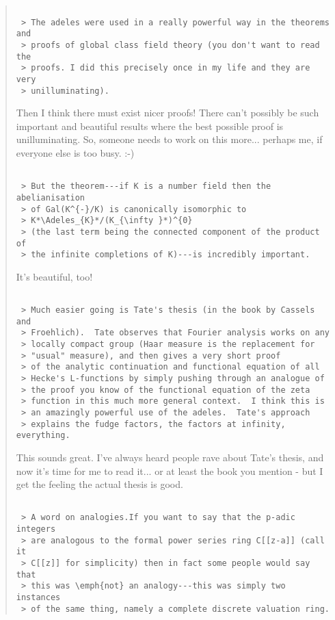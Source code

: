 \begin{quote}


\begin{verbatim}

 > The adeles were used in a really powerful way in the theorems and 
 > proofs of global class field theory (you don't want to read the 
 > proofs. I did this precisely once in my life and they are very 
 > unilluminating).
\end{verbatim}
    

 Then I think there must exist nicer proofs!  There can't possibly 
 be such important and beautiful results where the best possible proof
 is unilluminating.  So, someone needs to work on this more... perhaps
 me, if everyone else is too busy.  :-) 


\begin{verbatim}

 > But the theorem---if K is a number field then the abelianisation 
 > of Gal(K^{-}/K) is canonically isomorphic to 
 > K*\Adeles_{K}*/(K_{\infty }*)^{0}
 > (the last term being the connected component of the product of 
 > the infinite completions of K)---is incredibly important.
\end{verbatim}
    

 It's beautiful, too!


\begin{verbatim}

 > Much easier going is Tate's thesis (in the book by Cassels and 
 > Froehlich).  Tate observes that Fourier analysis works on any 
 > locally compact group (Haar measure is the replacement for 
 > "usual" measure), and then gives a very short proof 
 > of the analytic continuation and functional equation of all 
 > Hecke's L-functions by simply pushing through an analogue of 
 > the proof you know of the functional equation of the zeta 
 > function in this much more general context.  I think this is 
 > an amazingly powerful use of the adeles.  Tate's approach 
 > explains the fudge factors, the factors at infinity, everything.
\end{verbatim}
    

 This sounds great.  I've always heard people rave about Tate's thesis,
 and now it's time for me to read it... or at least the book you mention -
 but I get the feeling the actual thesis is good.


\begin{verbatim}

 > A word on analogies.If you want to say that the p-adic integers 
 > are analogous to the formal power series ring C[[z-a]] (call it 
 > C[[z]] for simplicity) then in fact some people would say that 
 > this was \emph{not} an analogy---this was simply two instances 
 > of the same thing, namely a complete discrete valuation ring.
\end{verbatim}
    


\end{quote}
